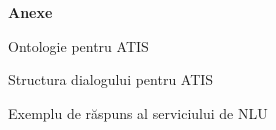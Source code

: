 \vspace{1.5cm} 
\textbf{\Huge Anexe}\\ 
\vspace{1.5cm}

 \setcounter{page}{1}

\large{Ontologie pentru ATIS}


\newpage
\large{Structura dialogului pentru ATIS}


\large{Exemplu de răspuns al serviciului de NLU}

